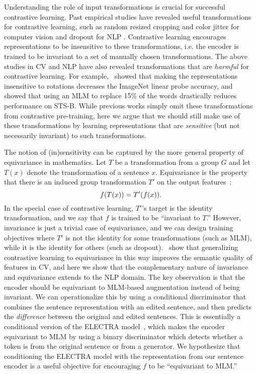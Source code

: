 \documentclass[11pt]{article}
\begin{document}
Understanding the role of input transformations is crucial for successful contrastive learning. Past empirical studies have revealed useful transformations for contrastive learning, such as random resized cropping and color jitter for computer vision \cite{chen2020simple} and dropout for NLP \cite{gao2021simcse}. Contrastive learning encourages representations to be insensitive to these transformations, i.e. the encoder is trained to be invariant to a set of manually chosen transformations. 
The above studies in CV and NLP have also revealed transformations that are \emph{harmful} for contrastive learning. For example,~\citet{chen2020simple} showed that making the representations insensitive to rotations decreases the ImageNet linear probe accuracy, and~\citet{gao2021simcse} showed that using an MLM to replace 15\% of the words drastically reduces performance on STS-B. While previous works simply omit these transformations from contrastive pre-training, here we argue that we should still make use of these transformations by learning representations that are  \emph{sensitive} (but not necessarily invariant) to such transformations.


The notion of (in)sensitivity can be captured by the more general property of equivariance in mathematics. Let $T$ be a transformation from a group $G$ and let $T(x)$ denote the transformation of a sentence $x$. Equivariance is the property that there is an induced group transformation $T'$ on the output features~\citep{dangovski2021equivariant}:
\vspace{-5pt}
\[
f(T(x))=T'(f(x)).
\vspace{-5pt}
\]
In the special case of contrastive learning, $T'$'s target is the identity transformation, and we say that $f$ is trained to be ``invariant to $T$.'' However, invariance is just a trivial case of equivariance, and we can design training objectives where $T'$ is not the identity for some transformations (such as MLM), while it is the identity for others (such as dropout). \citet{dangovski2021equivariant}~show that generalizing contrastive learning to equivariance in this way improves the semantic quality of features in CV, and here we show that the complementary nature of invariance and equivariance extends to the NLP domain. The key observation is that the encoder should be equivariant to MLM-based augmentation instead of being invariant. 
We can operationalize this by using a conditional discriminator that combines the sentence representation with an edited sentence, and then predicts the \emph{difference} between the original and edited sentences. This is essentially a conditional version of the ELECTRA model~\citep{clark2020electra}, which makes the encoder equivariant to MLM by using a binary discriminator which detects whether a token is from the original sentence or from a generator. We hypothesize that conditioning the ELECTRA model with the representation from our sentence encoder is a useful objective for encouraging $f$ to be ``equivariant to MLM.''
\end{document}
